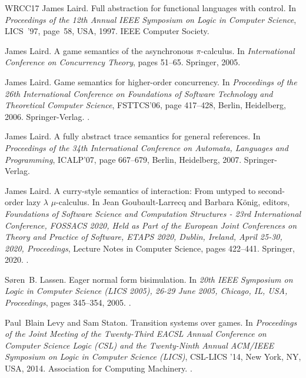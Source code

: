 \documentclass[11pt,a4paper]{amsart}
\theoremstyle{plain}
\theoremstyle{definition}
\theoremstyle{defC}
\theoremstyle{thmC}
\theoremstyle{plain}
\numberwithin{equation}{section}
\theoremstyle{plain}
\theoremstyle{definition}
\begin{document}
\begin{thebibliography}{WRCC17}
James Laird.
\newblock Full abstraction for functional languages with control.
\newblock In {\em Proceedings of the 12th Annual IEEE Symposium on Logic in
  Computer Science}, LICS~'97, page~58, USA, 1997. IEEE Computer Society.

James Laird.
\newblock A game semantics of the asynchronous $\pi$-calculus.
\newblock In {\em International Conference on Concurrency Theory}, pages
  51--65. Springer, 2005.

James Laird.
\newblock Game semantics for higher-order concurrency.
\newblock In {\em Proceedings of the 26th International Conference on
  Foundations of Software Technology and Theoretical Computer Science},
  FSTTCS'06, page 417–428, Berlin, Heidelberg, 2006. Springer-Verlag.
\newblock \href {https://doi.org/10.1007/11944836.38}
  {}.

James Laird.
\newblock A fully abstract trace semantics for general references.
\newblock In {\em Proceedings of the 34th International Conference on Automata,
  Languages and Programming}, ICALP’07, page 667–679, Berlin, Heidelberg,
  2007. Springer-Verlag.

James Laird.
\newblock A curry-style semantics of interaction: From untyped to second-order
  lazy {\(\lambda\)} {\(\mu\)}-calculus.
\newblock In Jean Goubault{-}Larrecq and Barbara K{\"{o}}nig, editors, {\em
  Foundations of Software Science and Computation Structures - 23rd
  International Conference, {FOSSACS} 2020, Held as Part of the European Joint
  Conferences on Theory and Practice of Software, {ETAPS} 2020, Dublin,
  Ireland, April 25-30, 2020, Proceedings}, Lecture Notes in Computer Science,
  pages 422--441. Springer, 2020.
\newblock \href {https://doi.org/10.1007/978-3-030-45231-5\_22}
  {}.

S{\o}ren~B. Lassen.
\newblock Eager normal form bisimulation.
\newblock In {\em 20th {IEEE} Symposium on Logic in Computer Science {(LICS}
  2005), 26-29 June 2005, Chicago, IL, USA, Proceedings}, pages 345--354, 2005.
\newblock \href {https://doi.org/10.1109/LICS.2005.15}
  {}.

Paul~Blain Levy and Sam Staton.
\newblock Transition systems over games.
\newblock In {\em Proceedings of the Joint Meeting of the Twenty-Third EACSL
  Annual Conference on Computer Science Logic (CSL) and the Twenty-Ninth Annual
  ACM/IEEE Symposium on Logic in Computer Science (LICS)}, CSL-LICS ’14, New
  York, NY, USA, 2014. Association for Computing Machinery.
\newblock \href {https://doi.org/10.1145/2603088.2603150}
  {}.


\end{thebibliography}
\end{document}
